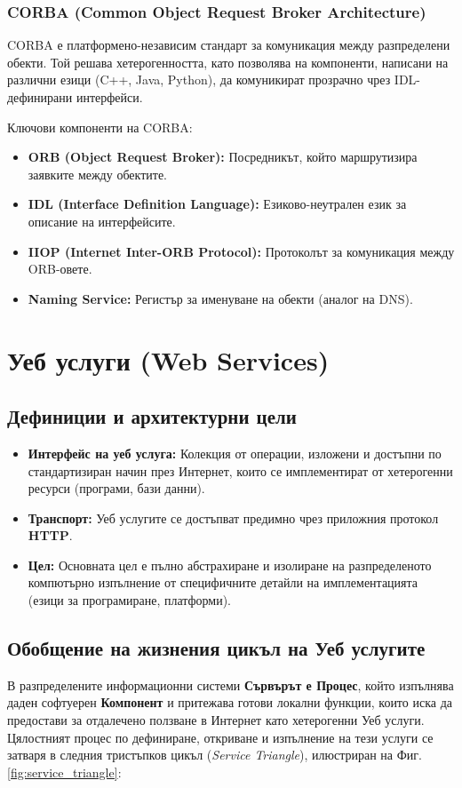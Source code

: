 \documentclass{scrartcl}
\begin{document}
\begin{FlushLeft}
\subsubsection{CORBA (Common Object Request Broker Architecture)}
CORBA е платформено-независим стандарт за комуникация между разпределени обекти. Той решава хетерогенността, като позволява на компоненти, написани на различни езици (C++, Java, Python), да комуникират прозрачно чрез IDL-дефинирани интерфейси.

Ключови компоненти на CORBA:
\begin{itemize}
    \item \textbf{ORB (Object Request Broker):} Посредникът, който маршрутизира заявките между обектите.
    \item \textbf{IDL (Interface Definition Language):} Езиково-неутрален език за описание на интерфейсите.
    \item \textbf{IIOP (Internet Inter-ORB Protocol):} Протоколът за комуникация между ORB-овете.
    \item \textbf{Naming Service:} Регистър за именуване на обекти (аналог на DNS).
\end{itemize}

\section{Уеб услуги (Web Services)}

\subsection{Дефиниции и архитектурни цели}
\begin{itemize}
    \item \textbf{Интерфейс на уеб услуга:} Колекция от операции, изложени и достъпни по стандартизиран начин през Интернет, които се имплементират от хетерогенни ресурси (програми, бази данни).
    \item \textbf{Транспорт:} Уеб услугите се достъпват предимно чрез приложния протокол \textbf{HTTP}.
    \item \textbf{Цел:} Основната цел е пълно абстрахиране и изолиране на разпределеното компютърно изпълнение от специфичните детайли на имплементацията (езици за програмиране, платформи). 
\end{itemize}

\subsection{Обобщение на жизнения цикъл на Уеб услугите}
В разпределените информационни системи \textbf{Сървърът е Процес}, който изпълнява даден софтуерен \textbf{Компонент} и притежава готови локални функции, които иска да предостави за отдалечено ползване в Интернет като хетерогенни Уеб услуги. Цялостният процес по дефиниране, откриване и изпълнение на тези услуги се затваря в следния тристъпков цикъл (\textit{Service Triangle}), илюстриран на Фиг. \ref{fig:service_triangle}:


\end{FlushLeft}
\end{document}
